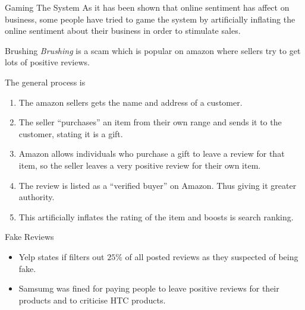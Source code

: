 \documentclass[11pt,a4paper]{article}
\begin{document}
\begin{proposition}{Gaming The System}
  As it has been shown that online sentiment has affect on business, some people have tried to game the system by artificially inflating the online sentiment about their business in order to stimulate sales.
\end{proposition}

\begin{definition}{Brushing}
  \textit{Brushing} is a scam which is popular on amazon where sellers try to get lots of positive reviews.
  \par The general process is
  \begin{enumerate}
    \item The amazon sellers gets the name and address of a customer.
    \item The seller ``purchases'' an item from their own range and sends it to the customer, stating it is a gift.
    \item Amazon allows individuals who purchase a gift to leave a review for that item, so the seller leaves a very positive review for their own item.
    \item The review is listed as a ``verified buyer'' on Amazon. Thus giving it greater authority.
    \item This artificially inflates the rating of the item and boosts is search ranking.
  \end{enumerate}
\end{definition}

\begin{remark}{Fake Reviews}
  \begin{itemize}
    \item Yelp states if filters out $25\%$ of  all posted reviews as they suspected of being fake.
    \item Samsumg was fined for paying people to leave positive reviews for their products and to criticise HTC products.
  \end{itemize}
\end{remark}
\end{document}
